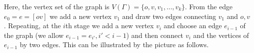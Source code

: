 \documentclass[11pt]{amsart}
\theoremstyle{definition}
\theoremstyle{remark}
\numberwithin{equation}{section}
\begin{document}
Here, the vertex set of the graph is $V(\Gamma)=\{o,v,v_1,\dots,v_k\}$. 
From the edge $e_0=e=[ov]$ we add a new vertex $v_1$ and draw two edges connecting $v_1$ and $o,v$. 
Repeating, at the $i$th stage we add a new vertex $v_i$ and choose an edge $e_{i-1}$ of the graph (we allow $e_{i-1}=e_{i'},i'<i-1$) and then connect $v_i$ and the vertices of $e_{i-1}$ by two edges. This can be illustrated by the picture as follows.
\begin{figure}[htb]
  \centering



\begin{tikzpicture}[x=0.75pt,y=0.75pt,yscale=-1,xscale=1]


\end{tikzpicture}
\end{figure}
\end{document}
